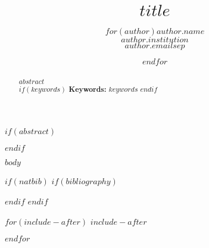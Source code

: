 \documentclass[notitlepage,12pt]{jedm}
\begin{document}
\title{$title$}
\date{} %

\author{$for(author)${\large $author.name$}\\$author.institution$\\$author.email$$sep$ \and $endfor$}

\maketitle

$if(abstract)$
\begin{abstract}
$abstract$\\ %

$if(keywords)$
{\parindent0pt
\textbf{Keywords:} $keywords$
}
$endif$
\end{abstract}
$endif$

$body$

$if(natbib)$
$if(bibliography)$

$endif$
$endif$

$for(include-after)$
$include-after$

$endfor$
\end{document}
